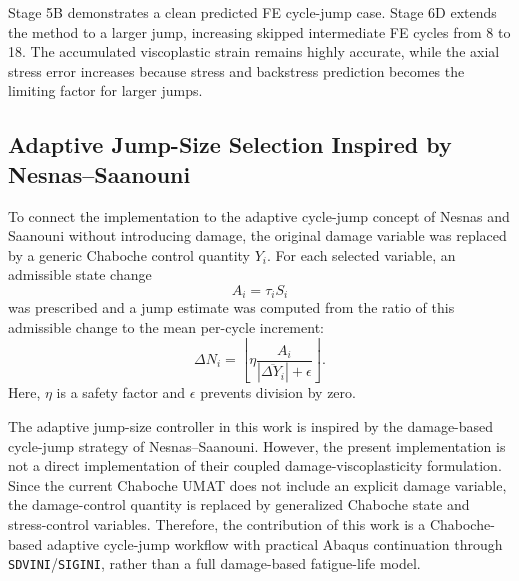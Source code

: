 \begin{table}[htbp]
\centering
\small
{}
\caption{Stage 6D larger predicted-state FE cycle-jump result. The comparison used an interpolated exact-time cycle-30 reference from the 50-cycle Abaqus ODB.}
\label{tab:stage6d_predicted_fe_jump}
\end{table}

Stage 5B demonstrates a clean predicted FE cycle-jump case. Stage 6D extends the method to a larger jump, increasing skipped intermediate FE cycles from 8 to 18. The accumulated viscoplastic strain remains highly accurate, while the axial stress error increases because stress and backstress prediction becomes the limiting factor for larger jumps.

\subsection{Adaptive Jump-Size Selection Inspired by Nesnas--Saanouni}

To connect the implementation to the adaptive cycle-jump concept of Nesnas and Saanouni without introducing damage, the original damage variable was replaced by a generic Chaboche control quantity \(Y_i\). For each selected variable, an admissible state change
\begin{equation}
A_i = \tau_i S_i
\end{equation}
was prescribed and a jump estimate was computed from the ratio of this admissible change to the mean per-cycle increment:
\begin{equation}
\Delta N_i =
\left\lfloor
\eta
\frac{A_i}{|\overline{\Delta Y_i}|+\epsilon}
\right\rfloor .
\end{equation}
Here, \(\eta\) is a safety factor and \(\epsilon\) prevents division by zero.

The adaptive jump-size controller in this work is inspired by the damage-based cycle-jump strategy of Nesnas--Saanouni. However, the present implementation is not a direct implementation of their coupled damage-viscoplasticity formulation. Since the current Chaboche UMAT does not include an explicit damage variable, the damage-control quantity is replaced by generalized Chaboche state and stress-control variables. Therefore, the contribution of this work is a Chaboche-based adaptive cycle-jump workflow with practical Abaqus continuation through \texttt{SDVINI}/\texttt{SIGINI}, rather than a full damage-based fatigue-life model.

